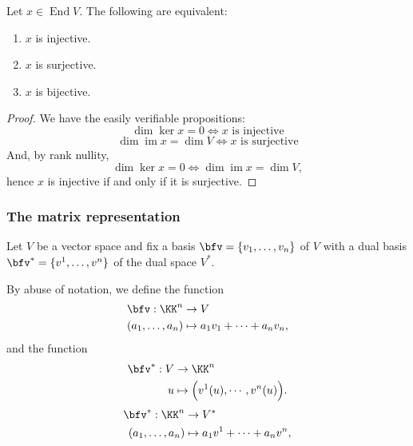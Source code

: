 \documentclass{article}
\DeclareMathOperator{\End}{End}
\DeclareMathOperator{\im}{im}
\begin{document}
\begin{corollary}
    Let $x \in \End V$.
    The following are equivalent:
    \begin{enumerate}[label=(\alph*)]
        \item
            $x$ is injective.
        \item
            $x$ is surjective.
        \item
            $x$ is bijective.
    \end{enumerate}
\end{corollary}

\begin{proof}
    We have the easily verifiable propositions:
    \[
        \dim \ker x = 0 \iff x \text{ is injective}
    \]
    \[
        \dim \im x = \dim V \iff x \text{ is surjective}
    \]
    And, by rank nullity,
    \[
        \dim \ker x = 0
        \iff
        \dim \im x = \dim V,
    \]
    hence $x$ is injective if and only if it is surjective.
\end{proof}

\subsubsection{The matrix representation}

\begin{definition}
    Let $V$ be a vector space and fix a basis $\bfv = \{v_1,\ldots,v_n\}$ of $V$ with a dual basis $\bfv^\ast = \{v^1, \ldots, v^n\}$ of the dual space $V^\ast$.

    By abuse of notation, we define the function
    \begin{align*}
        \bfv:
        \KK^n
        &\to
        V
        \\
        (a_1, \ldots, a_n) 
        &\mapsto 
        a_1v_1 + \cdots + a_nv_n,
    \end{align*}
    and the function
    \begin{align*}
        \bfv^\ast:
        V
        &\to
        \KK^n
        \\
        u 
        &\mapsto 
        \Big(v^1(u), \cdots, v^n(u)\Big).
    \end{align*}
    \begin{align*}
        \bfv^\ast:
        \KK^n
        &\to
        V^\ast
        \\
        (a_1, \ldots, a_n) 
        &\mapsto 
        a_1v^1 + \cdots + a_nv^n,
    \end{align*}
\end{definition}
\end{document}
